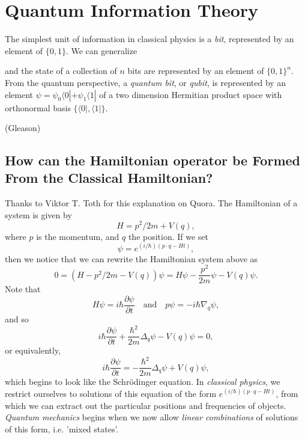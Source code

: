 \chapter{Quantum Information Theory}

The simplest unit of information in classical physics is a \emph{bit}, represented by an element of $\{ 0, 1 \}$. We can generalize 


 and the state of a collection of $n$ bits are represented by an element of $\{ 0, 1 \}^n$. From the quantum perspective, a \emph{quantum bit}, or \emph{qubit}, is represented by an element $\psi = \psi_0 \langle 0 | + \psi_1 \langle 1 |$ of a two dimension Hermitian product space with orthonormal basis $\{ \langle 0 |, \langle 1 | \}$.

(Gleason)





\newpage

\section{How can the Hamiltonian operator be Formed From the Classical Hamiltonian?}

Thanks to Viktor T. Toth for this explanation on Quora. The Hamiltonian of a system is given by
%
\[ H = p^2/2m + V(q), \]
%
where $p$ is the momentum, and $q$ the position. If we set
%
\[ \psi = e^{(i / \hbar) (p \cdot q - Ht)}, \]
%
then we notice that we can rewrite the Hamiltonian system above as
%
\[ 0 = (H - p^2/2m - V(q)) \psi = H \psi - \frac{p^2}{2m} \psi - V(q) \psi. \]
%
Note that
%
\[ H \psi = i \hbar \frac{\partial \psi}{\partial t} \quad\text{and}\quad p \psi = - i \hbar \nabla_q \psi, \]
and so
%
\[ i \hbar \frac{\partial \psi}{\partial t} + \frac{\hbar^2}{2m} \Delta_q \psi - V(q) \psi = 0, \]
%
or equivalently,
%
\[ i\hbar \frac{\partial \psi}{\partial t} = - \frac{\hbar^2}{2m} \Delta_q \psi + V(q) \psi, \]
%
which begins to look like the Schr\"{o}dinger equation. In \emph{classical physics}, we restrict ourselves to solutions of this equation of the form $e^{(i / \hbar)(p \cdot q - Ht)}$, from which we can extract out the particular positions and frequencies of objects. \emph{Quantum mechanics} begins when we now allow \emph{linear combinations} of solutions of this form, i.e. 'mixed states'.



